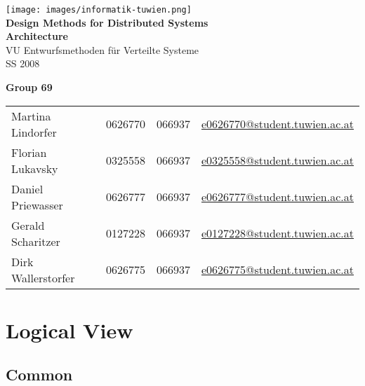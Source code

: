 \documentclass[a4paper]{article}
\begin{document}
\begin{titlepage}
	\bigskip
	\bigskip
	\bigskip
	\begin{center}
		\texttt{[image: images/informatik-tuwien.png]}\\
		\vspace{1cm}
		\Huge{\textsf{\textbf{Design Methods for Distributed Systems\\}}}
		\vspace{1cm}
		\huge{\textsf{\textbf{Architecture\\}}}
		\vspace{1cm}
		\LARGE{\textsf{VU Entwurfsmethoden f\"{u}r Verteilte Systeme\\}}
		\vspace{1cm}
		\Large{\textsf{SS 2008\\}}
	\end{center}
	\bigskip
	\begin{center}
		\large{\textsf{\textbf{Group 69}}}
	\end{center}
	\begin{tabular}{llll}
	\textsf{Martina Lindorfer} & \textsf{0626770} & \textsf{066937} & \url{e0626770@student.tuwien.ac.at}\\
	\textsf{Florian Lukavsky} & \textsf{0325558} & \textsf{066937} & \url{e0325558@student.tuwien.ac.at}\\
	\textsf{Daniel Priewasser} & \textsf{0626777} & \textsf{066937} & \url{e0626777@student.tuwien.ac.at}\\
	\textsf{Gerald Scharitzer} & \textsf{0127228} & \textsf{066937} & \url{e0127228@student.tuwien.ac.at}\\
	\textsf{Dirk Wallerstorfer} & \textsf{0626775} & \textsf{066937} & \url{e0626775@student.tuwien.ac.at}\\
	\end{tabular}
\end{titlepage}

\clearpage

\pagestyle{fancy}				
\cfoot{\small{\thepage\ / \pageref{LastPage}}}

\tableofcontents

\newpage
\section{Logical View}

\cite{zdun2008}

\subsection{Common}
\end{document}

